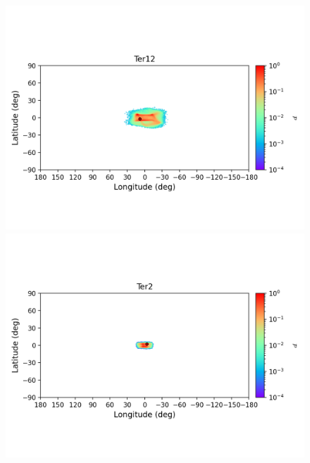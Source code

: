 \begin{figure}
\begin{center}
                \includegraphics[clip=true, trim = 0mm 20mm 0mm 10mm, width=1\columnwidth]{images/error_plots_Ter12.png}
                \includegraphics[clip=true, trim = 0mm 20mm 0mm 10mm, width=1\columnwidth]{images/error_plots_Ter2.png}
                

\end{center}
\end{figure}
